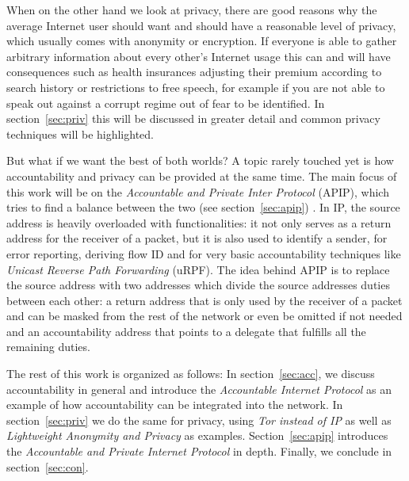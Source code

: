 \documentclass{acm_proc_article-sp}
\begin{document}
When on the other hand we look at privacy, there are good reasons why the average Internet user should want and should have a reasonable level of privacy, which usually comes with anonymity or encryption. If everyone is able to gather arbitrary information about every other's Internet usage this can and will have consequences such as health insurances adjusting their premium according to search history or restrictions to free speech, for example if you are not able to speak out against a corrupt regime out of fear to be identified. In section~\ref{sec:priv} this will be discussed in greater detail and common privacy techniques will be highlighted.

But what if we want the best of both worlds? A topic rarely touched yet is how accountability and privacy can be provided at the same time. The main focus of this work will be on the \emph{Accountable and Private Inter Protocol} (APIP), which tries to find a balance between the two (see section~\ref{sec:apip}) \cite{apip}. In IP, the source address is heavily overloaded with functionalities: it not only serves as a return address for the receiver of a packet, but it is also used to identify a sender, for error reporting, deriving flow ID and for very basic accountability techniques like \emph{Unicast Reverse Path Forwarding} (uRPF). The idea behind APIP is to replace the source address with two addresses which divide the source addresses duties between each other: a return address that is only used by the receiver of a packet and can be masked from the rest of the network or even be omitted if not needed and an accountability address that points to a delegate that fulfills all the remaining duties.

The rest of this work is organized as follows: In section~\ref{sec:acc}, we discuss accountability in general and introduce the \emph{Accountable Internet Protocol} as an example of how accountability can be integrated into the network. In section~\ref{sec:priv} we do the same for privacy, using \emph{Tor instead of IP} as well as \emph{Lightweight Anonymity and Privacy} as examples. Section~\ref{sec:apip} introduces the \emph{Accountable and Private Internet Protocol} in depth. Finally, we conclude in section~\ref{sec:con}.

\end{document}
